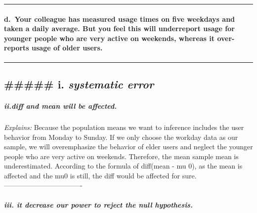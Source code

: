\documentclass[
]{article}
\begin{document}
\begin{center}\rule{0.5\linewidth}{0.5pt}\end{center}

\hypertarget{d.-your-colleague-has-measured-usage-times-on-five-weekdays-and-taken-a-daily-average.-but-you-feel-this-will-underreport-usage-for-younger-people-who-are-very-active-on-weekends-whereas-it-over-reports-usage-of-older-users.}{%
\paragraph{d.~Your colleague has measured usage times on five weekdays
and taken a daily average. But you feel this will underreport usage for
younger people who are very active on weekends, whereas it over-reports
usage of older
users.}\label{d.-your-colleague-has-measured-usage-times-on-five-weekdays-and-taken-a-daily-average.-but-you-feel-this-will-underreport-usage-for-younger-people-who-are-very-active-on-weekends-whereas-it-over-reports-usage-of-older-users.}}

\begin{center}\rule{0.5\linewidth}{0.5pt}\end{center}

\hypertarget{i.-systematic-error-1}{%
\subsection{\texorpdfstring{\#\#\#\#\# i. \emph{systematic
error}}{\#\#\#\#\# i. systematic error}}\label{i.-systematic-error-1}}

\hypertarget{ii.diff-and-mean-will-be-affected.}{%
\subparagraph{\texorpdfstring{ii.\emph{diff and mean will be
affected.}}{ii.diff and mean will be affected.}}\label{ii.diff-and-mean-will-be-affected.}}

\emph{Explains:} Because the population means we want to inference
includes the user behavior from Monday to Sunday. If we only choose the
workday data as our sample, we will overemphasize the behavior of elder
users and neglect the younger people who are very active on weekends.
Therefore, the mean sample mean is underestimated. According to the
formula of diff(mean - mu 0), as the mean is affected and the mu0 is
still, the diff would be affected for sure.
----------------------------------

\hypertarget{iii.-it-decrease-our-power-to-reject-the-null-hypothesis.}{%
\subparagraph{\texorpdfstring{iii. \emph{it decrease our power to reject
the null
hypothesis.}}{iii. it decrease our power to reject the null hypothesis.}}\label{iii.-it-decrease-our-power-to-reject-the-null-hypothesis.}}
\end{document}
